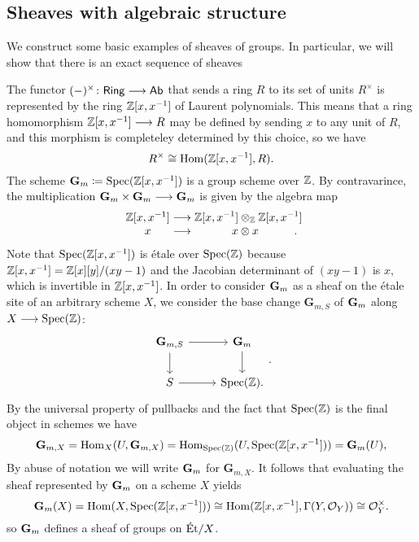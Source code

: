 \subsection{Sheaves with algebraic structure}
We construct some basic examples of sheaves of groups. In particular, we will show that there is an exact sequence of sheaves

\begin{example}
	The functor $(-)^\times\colon \mathsf{Ring} \longrightarrow \mathsf{Ab}$ that sends a ring $R$ to its set of units $R^\times$ is represented by the ring $\mathbb{Z}[x,x^{-1}]$ of Laurent polynomials. This means that a ring homomorphism $\mathbb{Z}[x,x^{-1}] \longrightarrow R$ may be defined by sending $x$ to any unit of $R$, and this morphism is completeley determined by this choice, so we have
	\[
		R^\times \cong \operatorname{Hom}(\mathbb{Z}[x,x^{-1}], R).
	\]
	The scheme $\mathbf{G}_m \coloneqq \operatorname{Spec}(\mathbb{Z}[x, x^{-1}])$ is a group scheme over $\mathbb{Z}$. By contravarince, the multiplication $\mathbf{G}_m \times \mathbf{G}_m \longrightarrow \mathbf{G}_m$ is given by the algebra map
	\[
		\begin{array}{c @{{}\to{}} c @{{}{}} c}
			\Z[x,x^{-1}] & \centermathcell{\Z[x,x^{-1}]\otimes_\Z \Z[x,x^{-1}]} \\
			x            & \centermathcell{\, x\otimes x}.
		\end{array}
	\]
	Note that $\operatorname{Spec}(\mathbb{Z}[x,x^{-1}])$ is \'etale over $\operatorname{Spec}(\mathbb{Z})$ because $\mathbb{Z}[x,x^{-1}] = \mathbb{Z}[x][y]/(xy-1)$ and the Jacobian determinant of $(xy-1)$ is $x$, which is invertible in $\mathbb{Z}[x,x^{-1}]$. In order to consider $\mathbf{G}_m$ as a sheaf on the \'etale site of an arbitrary scheme $X$, we consider the base change $\mathbf{G}_{m,S}$ of $\mathbf{G}_m$ along $X \longrightarrow \operatorname{Spec}(\mathbb{Z})$:
	\[
		\begin{tikzcd}
			{\mathbf{G}_{m,S}} & \Gm \\
			S & {\Spec(\Z)}.
			\arrow[from=1-1, to=1-2]
			\arrow[from=1-2, to=2-2]
			\arrow[from=2-1, to=2-2]
			\arrow[from=1-1, to=2-1]
		\end{tikzcd}.
	\]
	By the universal property of pullbacks and the fact that $\operatorname{Spec}(\mathbb{Z})$ is the final object in schemes we have
	\[
		\mathbf{G}_{m,X} = \operatorname{Hom}_X(U, \mathbf{G}_{m,X}) = \operatorname{Hom}_{\operatorname{Spec}(\mathbb{Z})}(U, \operatorname{Spec}(\mathbb{Z}[x,x^{-1}])) = \mathbf{G}_m(U),
	\]
	By abuse of notation we will write $\mathbf{G}_m$ for $\mathbf{G}_{m,X}$. It follows that evaluating the sheaf represented by $\mathbf{G}_m$ on a scheme $X$ yields
	\[
		\mathbf{G}_m(X) = \operatorname{Hom}(X, \operatorname{Spec}(\mathbb{Z}[x,x^{-1}])) \cong \operatorname{Hom}(\mathbb{Z}[x,x^{-1}], \Gamma(Y, \mathcal{O}_Y)) \cong \mathcal{O}_Y^\times.
	\]
	so $\mathbf{G}_m$ defines a sheaf of groups on $\text{\'Et}/X$.

\end{example}


